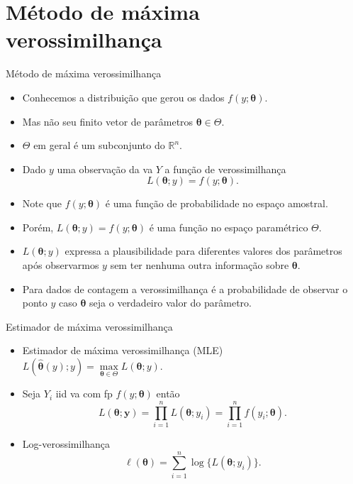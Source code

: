 \documentclass[10pt, aspectratio=169]{beamer}\usepackage[]{graphicx}\usepackage[]{color}
\begin{document}

\section{Método de máxima verossimilhança}
\label{Section3}




\begin{frame}{Método de máxima verossimilhança}
\begin{itemize}
  \item Conhecemos a distribuição que gerou os dados $f(y;\boldsymbol{\theta})$.
  \item Mas não seu finito vetor de parâmetros $\boldsymbol{\theta} \in \Theta$.
  \item $\Theta$ em geral é um subconjunto do $\mathbb{R}^n$.
  \item Dado $y$ uma observação da va $Y$ a função de verossimilhança 
  $$ L(\boldsymbol{\theta};y) = f(y;\boldsymbol{\theta}). $$
  \item Note que $f(y;\boldsymbol{\theta})$ é uma função de probabilidade
  no espaço amostral.
  \item Porém, $L(\boldsymbol{\theta};y) = f(y;\boldsymbol{\theta})$
  é uma função no espaço paramétrico $\Theta$.
  \item $L(\boldsymbol{\theta};y)$ expressa a plausibilidade para
  diferentes valores dos parâmetros após observarmos $y$ sem ter nenhuma
  outra informação sobre $\boldsymbol{\theta}$.
  \item Para dados de contagem a verossimilhança é a probabilidade de
  observar o ponto $y$ caso $\boldsymbol{\theta}$ seja o verdadeiro
  valor do parâmetro.
\end{itemize}
\end{frame}

\begin{frame}{Estimador de máxima verossimilhança}
\begin{itemize}
  \item Estimador de máxima verossimilhança (MLE) $L(\hat{\boldsymbol{\theta}}(y);y) = \underset{\boldsymbol{\theta}\in \Theta}\max L(\boldsymbol{\theta};y).$
  \item Seja $Y_i$ iid va com fp $f(y;\boldsymbol{\theta})$ então
  $$L(\boldsymbol{\theta};\boldsymbol{y}) = \prod_{i=1}^n L(\boldsymbol{\theta}; y_i) = \prod_{i=1}^n f(y_i; \boldsymbol{\theta}).$$
  \item Log-verossimilhança
  $$\ell(\boldsymbol{\theta})=\sum^n_{i=1} \log\{ L(\boldsymbol{\theta}; y_i) \}.$$
\end{itemize}
\end{frame}
\end{document}
